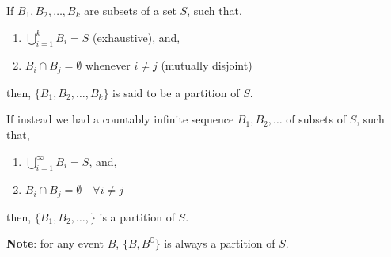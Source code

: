 \begin{definition}
    If $B_1, B_2, \dots, B_k$ are subsets of a set $S$, such that,
    \begin{enumerate}[noitemsep, topsep=0em]
        \item $\bigcup_{i=1}^k B_i = S$ (exhaustive), and,
        \item $B_i \cap B_j = \emptyset$ whenever $i \neq j$ 
              (mutually disjoint)
    \end{enumerate}
    then, $\lbrace B_1, B_2, \dots, B_k \rbrace$ is said to be a partition of
$S$.

    \noindent
    If instead we had a countably infinite sequence $B_1, B_2, \dots$ of
subsets of $S$, such that,
    \begin{enumerate}[noitemsep, topsep=0em]
        \item $\bigcup_{i=1}^\infty B_i = S$, and, 
        \item $B_i \cap B_j = \emptyset \quad \forall i \neq j$
    \end{enumerate}
    then, $\lbrace B_1, B_2, \dots, \rbrace$ is a partition of $S$.
\end{definition}

\noindent \textbf{Note}: for any event $B$, $\lbrace B, B^\complement \rbrace$
is always a partition of $S$.